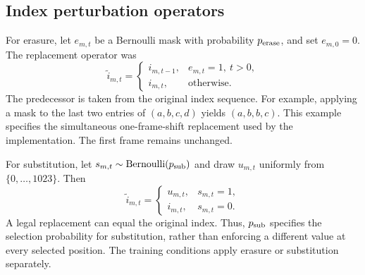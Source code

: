 \subsection{Index perturbation operators}
For erasure, let $e_{m,t}$ be a Bernoulli mask with probability $p_{\rm erase}$, and set $e_{m,0}=0$. The replacement operator was
\begin{equation}
 \widetilde i_{m,t}=
 \begin{cases}
 i_{m,t-1}, & e_{m,t}=1,\ t>0,\\
 i_{m,t}, & \text{otherwise}.
 \end{cases}
 \label{eq:sv2-erasure}
\end{equation}
The predecessor is taken from the original index sequence. For example, applying a mask to the last two entries of $(a,b,c,d)$ yields $(a,b,b,c)$. This example specifies the simultaneous one-frame-shift replacement used by the implementation. The first frame remains unchanged.

For substitution, let $s_{m,t}\sim\operatorname{Bernoulli}(p_{\rm sub})$ and draw $u_{m,t}$ uniformly from $\{0,\ldots,1023\}$. Then
\begin{equation}
 \widetilde i_{m,t}=
 \begin{cases}
 u_{m,t}, & s_{m,t}=1,\\
 i_{m,t}, & s_{m,t}=0.
 \end{cases}
 \label{eq:sv2-substitution}
\end{equation}
A legal replacement can equal the original index. Thus, $p_{\rm sub}$ specifies the selection probability for substitution, rather than enforcing a different value at every selected position. The training conditions apply erasure or substitution separately.

